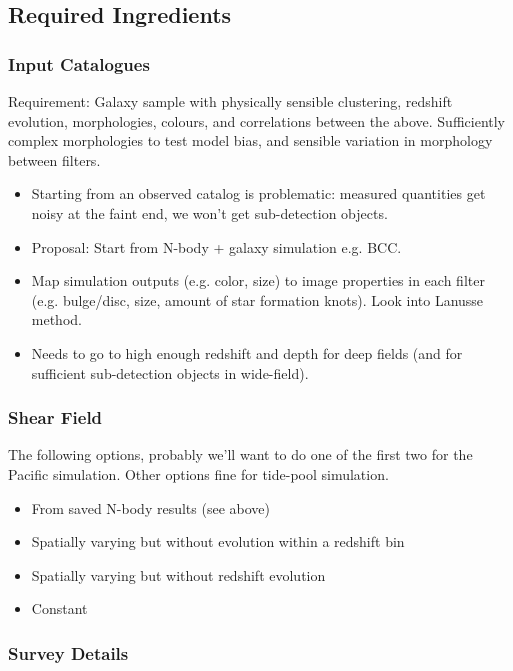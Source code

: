 \documentclass[\docopts]{\docclass}
\begin{document}
\subsection{Required Ingredients}

\subsubsection{Input Catalogues}

Requirement: Galaxy sample with physically sensible clustering, redshift evolution, morphologies, colours, and correlations between the above. Sufficiently complex morphologies to test model bias, and sensible variation in morphology between filters. 

\begin{itemize}
\item Starting from an observed catalog is problematic: measured quantities get noisy at the faint end, we won't get sub-detection objects.
\item Proposal: Start from N-body + galaxy simulation e.g. BCC.
\item Map simulation outputs (e.g. color, size) to image properties in each filter (e.g. bulge/disc, size, amount of star formation knots). Look into Lanusse method.
\item Needs to go to high enough redshift and depth for deep fields (and for sufficient sub-detection objects in wide-field).
\end{itemize}

\subsubsection{Shear Field}

The following options, probably we'll want to do one of the first two for the Pacific simulation. Other options fine for tide-pool simulation. 
\begin{itemize}
\item From saved N-body results (see above)
\item Spatially varying but without evolution within a redshift bin
\item Spatially varying but without redshift evolution
\item Constant
\end{itemize}

\subsubsection{Survey Details}
\end{document}
